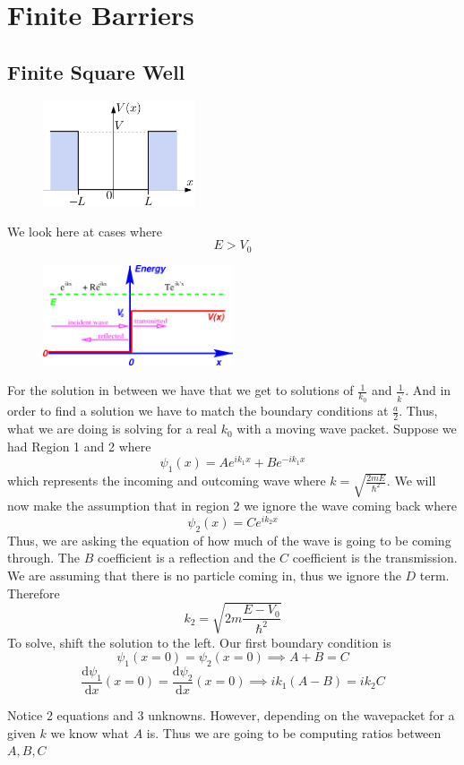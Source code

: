 \chapter{Finite Barriers}
\section{Finite Square Well}

\begin{figure}[H]
	\centering
	\includegraphics[width=0.4\textwidth]{Figures/03.png}
	\caption{}
	\label{fig:}
\end{figure}

We look here at cases where 
\[
	E > V_0
\]
\begin{figure}[H]
	\centering
	\includegraphics[width=0.5\textwidth]{Figures/04.png}
	\caption{}
	\label{fig:}
\end{figure}
For the solution in between we have that we get to solutions of \(\frac{1}{k_0}\) and \(\frac{1}{k^{\prime} }\). And 
in order to find a solution we have to match the boundary conditions at \(\frac{a}{2}\). Thus, what we are doing is solving for a real 
\(k_0\) with a moving wave packet.  Suppose we had Region 1 and 2 where 
\[
	\psi _1(x) = A e^{ik_1 x} + Be^{-ik_1 x}  
\]
which represents the incoming and outcoming wave where \(k= \sqrt{\frac{2mE}{\hbar ^{2} }} \). We will now make the assumption that in region 2 we ignore the wave coming back where
\[
	\psi _2 (x) = Ce^{ik_2 x} 
\] 
Thus, we are asking the equation of how much of the wave is going to be coming through. The \(B\) coefficient is a reflection and the 
\(C\) coefficient is the transmission. We are assuming that there is no particle coming in, thus we ignore the \(D\) term. Therefore
\[
	k_2 = \sqrt{2m\frac{E-V_0}{\hbar ^{2} }} 
\]
To solve, shift the solution to the left. Our first boundary condition is 
\[
	\psi _1(x=0) = \psi _2 (x=0) \implies A + B = C
\]
\[
	\frac{\mathrm{d}\psi_1}{\mathrm{d}x} (x=0) = \frac{\mathrm{d}\psi _2}{\mathrm{d}x} (x=0)  \implies ik_1(A-B) = ik_2 C
\]
\begin{remark}
	Notice 2 equations and 3 unknowns. However, depending on the wavepacket for a given \(k\) we know what \(A\) is.  
	Thus we are going to be computing ratios between \(A,B,C\) 
\end{remark}

